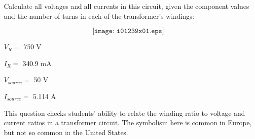 

Calculate all voltages and all currents in this circuit, given the component values and the number of turns in each of the transformer's windings:

$$\texttt{[image: i01239x01.eps]}$$







$V_R =$ 750 V

$I_R =$ 340.9 mA

\vskip 5pt

$V_{source} =$ 50 V

$I_{source} =$ 5.114 A







This question checks students' ability to relate the winding ratio to voltage and current ratios in a transformer circuit.  The symbolism here is common in Europe, but not so common in the United States.




